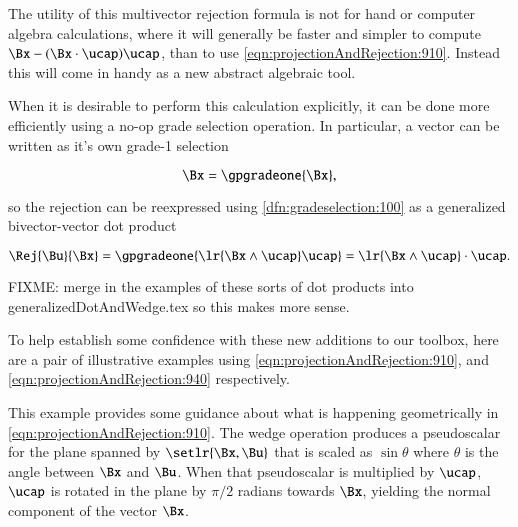 The utility of this multivector rejection formula is not for hand or computer algebra calculations, where it will generally be faster and simpler to compute \( \Bx - (\Bx \cdot \ucap) \ucap \), than to use \cref{eqn:projectionAndRejection:910}.
Instead this will come in handy as a new abstract algebraic tool.

When it is desirable to perform this calculation explicitly, it can be done more efficiently using a no-op grade selection operation.
In particular, a vector can be written as it's own grade-1 selection

\begin{dmath}\label{eqn:projectionAndRejection:920}
\Bx = \gpgradeone{ \Bx },
\end{dmath}

so the rejection can be reexpressed
using \cref{dfn:gradeselection:100}
as a generalized bivector-vector dot product

\begin{equation}\label{eqn:projectionAndRejection:940}
\Rej{\Bu}{\Bx}
= \gpgradeone{ \lr{ \Bx \wedge \ucap } \ucap }
= \lr{ \Bx \wedge \ucap } \cdot \ucap.
\end{equation}

FIXME: merge in the examples of these sorts of dot products into generalizedDotAndWedge.tex so this makes more sense.

To help establish some confidence with these new additions to our toolbox, here are a
pair of illustrative examples using
\cref{eqn:projectionAndRejection:910}, and
\cref{eqn:projectionAndRejection:940} respectively.


This example provides some guidance about what is happening geometrically in
\cref{eqn:projectionAndRejection:910}.
The wedge operation produces a pseudoscalar for the plane spanned by \( \setlr{\Bx, \Bu} \) that is scaled as \( \sin\theta \) where \( \theta \) is the angle between \( \Bx \) and \( \Bu \).  When that pseudoscalar is multiplied by \( \ucap \), \( \ucap \) is rotated in the plane by \( \pi/2 \) radians towards \( \Bx \), yielding the normal component of the vector \( \Bx \).

